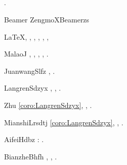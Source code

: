 \documentclass{article}
\begin{document}
\subsection{ }
\begin{frame}{ }
	\begin{scuproof}{}
		 .
	\end{scuproof}
	\begin{scualgorithm}{ Beamer }{ZengmoXBeamerzs}
		\begin{algorithmic}[1]
		\REQUIRE  \LaTeX  ,  
		\ENSURE  
		\STATE  ,  
		\STATE  ,  
		\STATE  ,  
		\RETURN  ,  ,  
		\end{algorithmic}
	\end{scualgorithm}
	\begin{scudefinition}{ }{MalaoJ}
		 ,  ,  ,  ,  .
	\end{scudefinition}
	\begin{sculemma}{ }{JuanwangSlfz}
		 ,  .
	\end{sculemma}
	\begin{scucorollary}{ }{LangrenSdzyx}
		 ,  ,  .
	\end{scucorollary}
	\begin{scuremark}{}{Zhu}
		\vref{coro:LangrenSdzyx},  ,  .
	\end{scuremark}
	\begin{scucondition}{ }{MianshiLrsdtj}
		\vref{coro:LangrenSdzyx},  ,  .
	\end{scucondition}
	\begin{scuconclusion}{ }{AifeiHdbz}
		 :  .
	\end{scuconclusion}
	\begin{scuassumption}{ }{BianzheBhfh}
		 ,  ,  .
	\end{scuassumption}
\end{frame}
\end{document}
